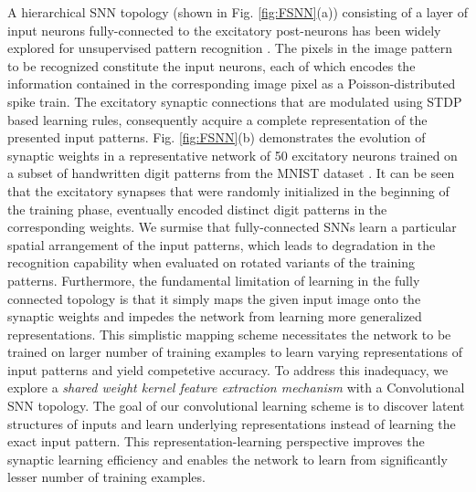 \documentclass[journal, onecolumn]{IEEEtran}
\begin{document}
A hierarchical SNN topology (shown in Fig. \ref{fig:FSNN}(a)) consisting of a layer of input neurons fully-connected to the excitatory post-neurons has been widely explored for unsupervised pattern recognition \cite{diehl2015unsupervised}. The pixels in the image pattern to be recognized constitute the input neurons, each of which encodes the information contained in the corresponding image pixel as a Poisson-distributed spike train. The excitatory synaptic connections that are modulated using STDP based learning rules, consequently acquire a complete representation of the presented input patterns. Fig. \ref{fig:FSNN}(b) demonstrates the evolution of synaptic weights in a representative network of 50 excitatory neurons trained on a subset of handwritten digit patterns from the MNIST dataset \cite{lecun1998mnist}. It can be seen that the excitatory synapses that were randomly initialized in the beginning of the training phase, eventually encoded distinct digit patterns in the corresponding weights. We surmise that fully-connected SNNs learn a particular spatial arrangement of the input patterns, which leads to degradation in the recognition capability when evaluated on rotated variants of the training patterns. Furthermore, the fundamental limitation of learning in the fully connected topology is that it simply maps the given input image onto the synaptic weights and impedes the network from learning more generalized representations. This simplistic mapping scheme necessitates the network to be trained on larger number of training examples to learn varying representations of input patterns and yield competetive accuracy. To address this inadequacy, we explore a \textit{shared weight kernel feature extraction mechanism} with a Convolutional SNN topology. The goal of our convolutional learning scheme is to discover latent structures of inputs and learn underlying representations instead of learning the exact input pattern. This representation-learning perspective improves the synaptic learning efficiency and enables the network to learn from significantly lesser number of training examples.
\end{document}
